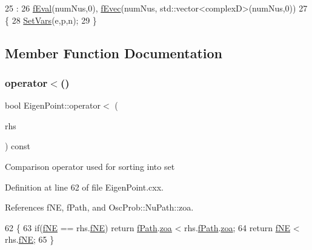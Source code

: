 \begin{DoxyCode}
25                                                              :
26 \hyperlink{structOscProb_1_1EigenPoint_a5c5e729d82e3aca1964c1777f4882f9d}{fEval}(numNus,0), \hyperlink{structOscProb_1_1EigenPoint_adf3ccb3d88ea1ae6ef3635fea8748e09}{fEvec}(numNus, std::vector<complexD>(numNus,0))
27 \{
28   \hyperlink{structOscProb_1_1EigenPoint_a2e293e0820715950ec8fb370e8cc9477}{SetVars}(e,p,n);
29 \}
\end{DoxyCode}


\subsection{Member Function Documentation}
\mbox{\label{structOscProb_1_1EigenPoint_ac171b4676fdae01c74eb3ed1fcd9efca}} 
\subsubsection{\texorpdfstring{operator$<$()}{operator<()}}
{\footnotesize\ttfamily bool Eigen\+Point\+::operator$<$ (\begin{DoxyParamCaption}\item[{const \hyperlink{structOscProb_1_1EigenPoint}{Eigen\+Point} \&}]{rhs }\end{DoxyParamCaption}) const}

Comparison operator used for sorting into set 

Definition at line 62 of file Eigen\+Point.\+cxx.



References f\+NE, f\+Path, and Osc\+Prob\+::\+Nu\+Path\+::zoa.


\begin{DoxyCode}
62                                                         \{
63   \textcolor{keywordflow}{if}(\hyperlink{structOscProb_1_1EigenPoint_af985afcb8012deb6de4fcba66342e0d2}{fNE} == rhs.\hyperlink{structOscProb_1_1EigenPoint_af985afcb8012deb6de4fcba66342e0d2}{fNE}) \textcolor{keywordflow}{return} \hyperlink{structOscProb_1_1EigenPoint_a1c263b6ceef5bd4de3181182f944efbb}{fPath}.\hyperlink{structOscProb_1_1NuPath_af3213f3691ba83c6bc05f4a3490f6b31}{zoa} < rhs.\hyperlink{structOscProb_1_1EigenPoint_a1c263b6ceef5bd4de3181182f944efbb}{fPath}.\hyperlink{structOscProb_1_1NuPath_af3213f3691ba83c6bc05f4a3490f6b31}{zoa};
64   \textcolor{keywordflow}{return} \hyperlink{structOscProb_1_1EigenPoint_af985afcb8012deb6de4fcba66342e0d2}{fNE} < rhs.\hyperlink{structOscProb_1_1EigenPoint_af985afcb8012deb6de4fcba66342e0d2}{fNE};
65 \}
\end{DoxyCode}
\mbox{\label{structOscProb_1_1EigenPoint_a5f71d78d02e8169307d069e7516c94e9}} 

